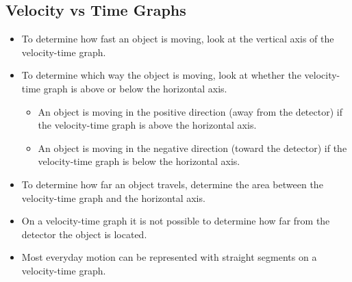 \documentclass[letterpaper, 12pt]{article}
\begin{document}
\subsection*{Velocity vs Time Graphs}
\begin{itemize}
	\item To determine how fast an object is moving, look at the vertical axis of the velocity-time graph.
	\item To determine which way the object is moving, look at whether the velocity-time graph is above or below the horizontal axis.
	\begin{itemize}
		\item  An object is moving in the positive direction (away from the detector) if the velocity-time graph is above the horizontal axis.
		\item An object is moving in the negative direction (toward the detector) if the velocity-time graph is below the horizontal axis.  
		\end{itemize}
	\item To determine how far an object travels, determine the area between the velocity-time graph and the horizontal axis.
	\item On a velocity-time graph it is not possible to determine how far from the detector the object is located.
	\item Most everyday motion can be represented with straight segments on a velocity-time graph.
	
	
\end{itemize}

	
\end{document}
